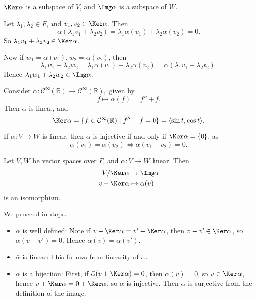 \documentclass[12pt]{article}
\begin{document}
\begin{lemma}
	$\Ker \alpha$ is a subspace of $V$, and $\Img \alpha$ is a subspace of $W$.
\end{lemma}

\begin{proofbox}
	Let $\lambda_1, \lambda_2 \in F$, and $v_1, v_2 \in \Ker \alpha$. Then
\[
	\alpha (\lambda_1 v_1 + \lambda_2 v_2) = \lambda_1 \alpha(v_1) + \lambda_2 \alpha(v_2) = 0
.\]
So $\lambda_1 v_1 + \lambda_2 v_2 \in \Ker \alpha$.

Now if $w_1 = \alpha(v_1), w_2 = \alpha (v_2)$, then
 \[
	 \lambda_1 w_1 + \lambda_2 w_2 = \lambda_1 \alpha(v_1) + \lambda_2 \alpha(v_2) = \alpha(\lambda_1 v_1 + \lambda_2 v_2)
.\]
Hence $\lambda_1 w_1 + \lambda_2 w_2 \in \Img \alpha$.
\end{proofbox}

\begin{exbox}
	Consider $\alpha : \mathcal{C}^{\infty}(\mathbb{R}) \to \mathcal{C}^{\infty}(\mathbb{R}),$ given by
	\[
		f \mapsto \alpha(f) = f'' + f
	.\]
	Then $\alpha$ is linear, and
	\[
		\Ker \alpha = \{f \in \mathcal{C}^{\infty}(\mathbb{R}) \mid f'' + f = 0\} = \langle \sin t, \cos t \rangle
	.\]
\end{exbox}

\begin{remark}
	If $\alpha : V \to W$ is linear, then $\alpha$ is injective if and only if $\Ker \alpha = \{0\}$, as
	\[
		\alpha(v_1) = \alpha(v_2) \iff \alpha(v_1 - v_2) = 0
	.\]
\end{remark}

\begin{theorem}
	Let $V, W$ be vector spaces over $F$, and $\alpha : V \to W$ linear. Then
	\begin{align*}
		V/\Ker \alpha &\to \Img \alpha \\
		v + \Ker \alpha &\mapsto \alpha(v)
	\end{align*}
	is an isomorphism.
\end{theorem}

\begin{proofbox}
	We proceed in steps.
\begin{itemize}
	\item $\bar \alpha$ is well defined: Note if $v + \Ker \alpha = v' + \Ker \alpha$, then $v - v' \in \Ker \alpha$, so $\alpha(v - v') = 0$. Hence $\alpha(v) = \alpha(v')$.
	\item $\bar \alpha$ is linear: This follows from linearity of $\alpha$.
	\item $\bar \alpha$ is a bijection: First, if $\bar \alpha (v + \Ker \alpha) = 0$, then $\alpha(v) = 0$, so $v \in \Ker \alpha$, hence $v + \Ker \alpha = 0 + \Ker \alpha$, so $\alpha$ is injective. Then $\bar \alpha$ is surjective from the definition of the image.
\end{itemize}
\end{proofbox}
\end{document}
